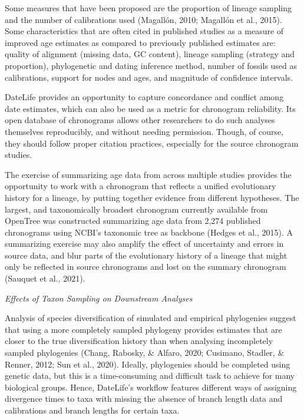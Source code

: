 \documentclass[english,man]{apa6}
\begin{document}
Some measures that have been proposed are the proportion of lineage sampling and the number of calibrations used (Magallón, 2010; Magallón et al., 2015).
Some characteristics that are often cited in published studies as a measure of improved age estimates as compared to previously published estimates are: quality of alignment (missing data, GC content), lineage sampling (strategy and proportion), phylogenetic and dating inference method, number of fossils used as calibrations, support for nodes and ages, and magnitude of confidence intervals.

DateLife provides an opportunity to capture concordance and conflict among date estimates, which can also be used as a metric for chronogram reliability.
Its open database of chronograms allows other researchers to do such analyses themselves reproducibly, and without needing permission. Though, of course, they should follow proper citation practices, especially for the source chronogram studies.

The exercise of summarizing age data from across multiple studies provides the opportunity to work with a chronogram that reflects a unified evolutionary history for a lineage, by putting together evidence from different hypotheses.
The largest, and taxonomically broadest chronogram currently available from OpenTree was constructed summarizing age data from 2,274 published chronograms using NCBI's taxonomic tree as backbone (Hedges et al., 2015).
A summarizing exercise may also amplify the effect of uncertainty and errors in source data, and blur parts of the evolutionary history of a lineage that might only be reflected in source chronograms and lost on the summary chronogram (Sauquet et al., 2021).

\begin{center}
\emph{Effects of Taxon Sampling on Downstream Analyses}
\end{center}

Analysis of species diversification of simulated and empirical phylogenies suggest that using a more completely sampled phylogeny provides estimates that are closer to the true diversification history than when analysing incompletely sampled phylogenies (Chang, Rabosky, \& Alfaro, 2020; Cusimano, Stadler, \& Renner, 2012; Sun et al., 2020).
Ideally, phylogenies should be completed using genetic data, but this is a time-consuming and difficult task to achieve for many biological groups.
Hence, DateLife's workflow features different ways of assigning divergence times to taxa with missing the absence of branch length data and calibrations and branch lengths for certain taxa.
\end{document}
